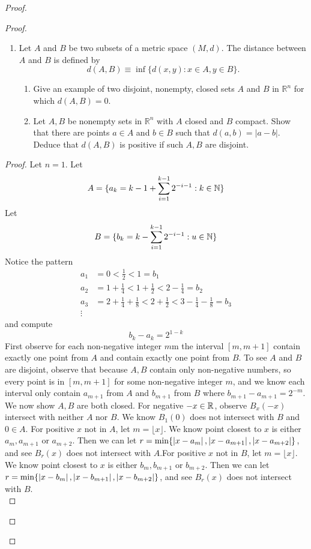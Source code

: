\documentclass{report}
\begin{document}
\begin{proof}
\begin{proof}
\begin{question}{}{}
\begin{enumerate}
    \item Let \( A \) and \( B \) be two subsets of a metric space \( (M,d) \). The distance between \( A \) and \( B \) is defined by
    \[
    d(A,B) \equiv \inf\{d(x,y) : x \in A, y \in B\}.
    \]
    \begin{enumerate}
        \item Give an example of two disjoint, nonempty, closed sets \( A \) and \( B \) in \( \mathbb{R}^n \) for which \( d(A, B) = 0 \).
        \item Let \( A, B \) be nonempty sets in \( \mathbb{R}^n \) with \( A \) closed and \( B \) compact. Show that there are points \( a \in A \) and \( b \in B \) such that \( d(a, b) = |a-b| \). Deduce that \( d(A, B) \) is positive if such \( A, B \) are disjoint.
    \end{enumerate}
\end{enumerate}
\end{question}
\begin{proof}
Let $n=1$. Let 
\begin{equation}
A=\{ a_k=k-1+\sum_{i=1}^{k-1}2^{-i-1}:k\in\mathbb{N} \}
\end{equation}
Let
\begin{equation}
B=\{ b_k=k-\sum_{i=1}^{k-1}2^{-i-1}:u\in\mathbb{N} \}
\end{equation}
Notice the pattern
\begin{align}
  a_1&=0<\frac{1}{2}< 1=b_1\\
  a_2&=1+\frac{1}{4}< 1+\frac{1}{2}< 2-\frac{1}{4}=b_2\\
  a_3&=2+\frac{1}{4}+\frac{1}{8}< 2+\frac{1}{2}< 3-\frac{1}{4}-\frac{1}{8}=b_3\\
  \vdots
\end{align}
and compute
\begin{equation}
b_k-a_k=2^{1-k}
\end{equation}
First observe for each non-negative integer $m$m the interval  $[m,m+1]$ contain exactly one point from $A$ and contain exactly one point from  $B$. To see  $A$ and  $B$ are disjoint, observe that because  $A,B$ contain only non-negative numbers, so every point is in $[m,m+1]$ for some non-negative integer $m$, and we know each interval only contain $a_{m+1}$ from $A$ and $b_{m+1}$ from $B$ where  $b_{m+1}-a_{m+1}=2^{-m}$.\\

We now show $A,B$ are both closed. For negative  $-x\in\mathbb{R}$, observe $B_{x}(-x)$ intersect with neither $A$ nor  $B$. We know $B_1(0)$ does not intersect with $B$ and  $0\in A$. For positive $x$ not in $A$, let $m=\lfloor x \rfloor$. We know point closest to $x$ is either $a_{m},a_{m+1}\text{ or }a_{m+2}$. Then we can let $r=\min \{ \left|x-a_m\right|,\left|x-a_{m+1}\right|,\left|x-a_{m+2}\right| \}$, and see $B_r(x)$ does not intersect with $A$.For positive $x$ not in $B$, let $m=\lfloor x \rfloor$. We know point closest to $x$ is either $b_{m},b_{m+1}\text{ or }b_{m+2}$. Then we can let $r=\min \{ \left|x-b_m\right|,\left|x-b_{m+1}\right|,\left|x-b_{m+2}\right| \}$, and see $B_r(x)$ does not intersect with $B$.\\


\end{proof}
\end{proof}
\end{proof}
\end{document}
